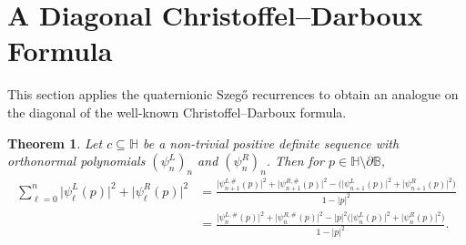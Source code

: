 \documentclass[11pt,reqno]{amsart}
\def\q{\psi}
\def\BB{\mathbb{B}}
\def\HH{\mathbb{H}}
\newtheorem{theorem}{Theorem}[section]
\theoremstyle{definition}
\numberwithin{equation}{section}
\begin{document}
\section{A Diagonal Christoffel--Darboux Formula}

This section applies the quaternionic Szeg\H{o} recurrences to obtain an analogue on the diagonal of the well-known Christoffel--Darboux formula.

\begin{theorem}
\label{thm:CDFDiagonal}
	Let \(c \subseteq \HH\) be a non-trivial positive definite sequence with orthonormal polynomials  \((\q_n^L)_n\) and \((\q_n^R)_n\). Then for \(p \in \HH\setminus\partial\BB\),
	\begin{align*}
		\sum_{\ell = 0}^n \lvert \q_\ell^L(p) \rvert^2 + \lvert \q_\ell^R(p) \rvert^2 & = \frac{\lvert \q_{n+1}^{L.\#}(p) \rvert^2 + \lvert \q_{n+1}^{R,\#}(p)\rvert^2 - \Big(\lvert \q_{n+1}^L(p) \rvert^2 + \lvert \q_{n+1}^R(p) \rvert^2\Big)}{1 - \lvert p \rvert^2} \\ 
		& = \frac{\lvert \q_n^{L,\#}(p) \rvert^2 + \lvert \q_n^{R,\#}(p) \rvert^2 - \lvert p \rvert^2 \Big(\lvert \q_n^L(p)\rvert^2 + \lvert \q_n^R(p) \rvert^2\Big)}{1 - \lvert p \rvert^2}.
	\end{align*}
\end{theorem}
\end{document}
